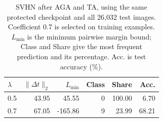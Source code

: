 \begin{table}[!htbp]
\centering
\small
\setlength{\tabcolsep}{3pt}
\caption{SVHN after AGA and TA, using the same protected checkpoint and all 26,032 test images. Coefficient 0.7 is selected on training examples. $L_{\min}$ is the minimum pairwise margin bound; Class and Share give the most frequent prediction and its percentage. Acc. is test accuracy (\%).}
\label{tab:coefficient-readout}
\begin{tabular}{lrrrrr}
\toprule
$\lambda$ & $\|\Delta t\|_2$ & $L_{\min}$ & Class & Share & Acc. \\
\midrule
0.5 & 43.95 & 45.55 & 0 & 100.00 & 6.70 \\
0.7 & 67.05 & -165.86 & 9 & 23.99 & 68.21 \\
\bottomrule
\end{tabular}
\end{table}
